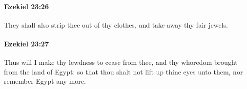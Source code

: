 		\paragraph{Ezekiel 23:26} %
			\label{EZEKIEL-23-26}

			They shall also strip thee out of thy clothes, and take away thy fair jewels.


		\paragraph{Ezekiel 23:27} %
			\label{EZEKIEL-23-27}

			Thus will I make thy lewdness to cease from thee, and thy whoredom brought from the land of Egypt: so that thou shalt not lift up thine eyes unto them, nor remember Egypt any more.


